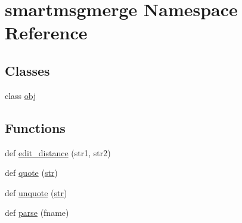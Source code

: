 \hypertarget{namespacesmartmsgmerge}{}\section{smartmsgmerge Namespace Reference}
\label{namespacesmartmsgmerge}
\subsection*{Classes}
\begin{DoxyCompactItemize}
\item 
class \hyperlink{classsmartmsgmerge_1_1obj}{obj}
\end{DoxyCompactItemize}
\subsection*{Functions}
\begin{DoxyCompactItemize}
\item 
def \hyperlink{namespacesmartmsgmerge_ad1a950cbf2bee6332a9e490bb726dd94}{edit\+\_\+distance} (str1, str2)
\item 
def \hyperlink{namespacesmartmsgmerge_a8ae4a9cc653616390fa5fee6e04eca33}{quote} (\hyperlink{sndfile__save_8m_a4b99ff73a8a869319570237b5c57ab03}{str})
\item 
def \hyperlink{namespacesmartmsgmerge_a5369bd324d0699cca3cce3ffdc0b46b4}{unquote} (\hyperlink{sndfile__save_8m_a4b99ff73a8a869319570237b5c57ab03}{str})
\item 
def \hyperlink{namespacesmartmsgmerge_a29421600d4fe00c8c5eb6cfaa0f5ca35}{parse} (fname)
\end{DoxyCompactItemize}
